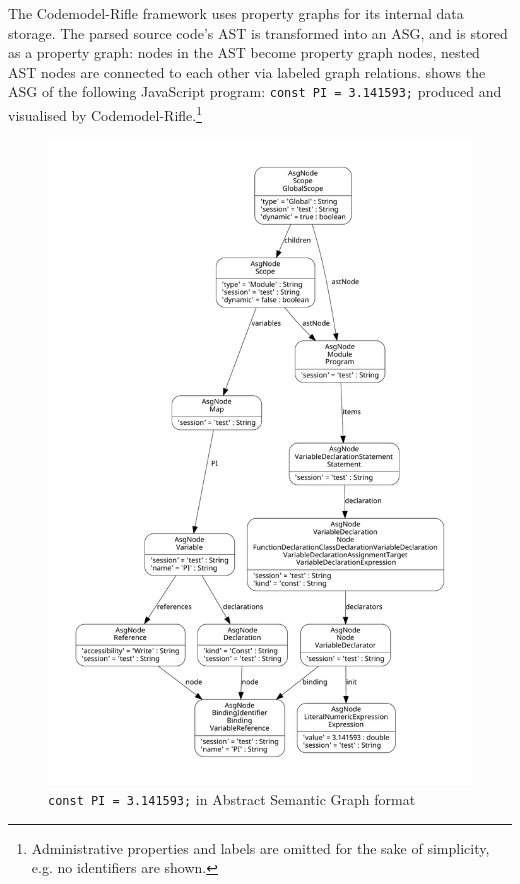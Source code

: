 The Codemodel-Rifle framework uses property graphs for its internal data storage. The parsed source code's AST is transformed into an ASG, and is stored as a property graph: nodes in the AST become property graph nodes, nested AST nodes are connected to each other via labeled graph relations.  shows the ASG of the following JavaScript program: \lstinline{const PI = 3.141593;} produced and visualised by Codemodel-Rifle.\footnote{Administrative properties and labels are omitted for the sake of simplicity, e.g. no identifiers are shown.}

\begin{figure}[!p]
	\centering
	\includegraphics[height=\textheight-18mm, trim=12mm 12mm 12mm 12mm,clip]{figures/codemodel-rifle-asg.pdf}
	\caption{\lstinline{const PI = 3.141593;} in Abstract Semantic Graph format}
	\label{fig:codemodel-rifle-asg}
\end{figure}

